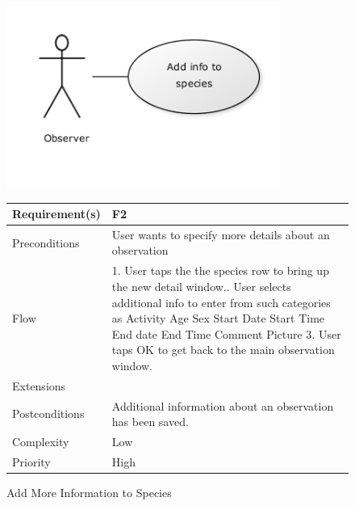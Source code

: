 \begin{figure}[!htb]
		\centering
		\includegraphics[width=0.8\textwidth]{reqspec/uc/addinfo.png}
		\caption{Add More Information to Species}
		\label{fig:addmore}

\begin{tabular}[t]{|l|p{}|}\hline
	Requirement(s)&F2\\\hline
	Preconditions&User wants to specify more details about an observation\\\hline
	Flow& 1. User taps the the species row to bring up the new detail window.\newline
	2. User selects additional info to enter from such categories as \newline
	Activity \newline
	Age\newline
	Sex\newline
	Start Date\newline
	Start Time\newline
	End date \newline
	End Time \newline
	Comment \newline
	Picture \newline
	3. User taps OK to get back to the main observation window.\\\hline
	Extensions& \\\hline
	Postconditions& Additional information about an observation has been saved.\\\hline
	Complexity&Low\\\hline
	Priority&High\\\hline
\end{tabular}
\end{figure}

